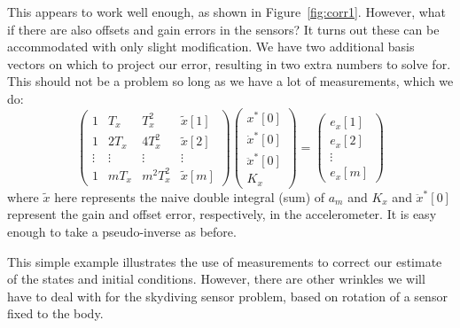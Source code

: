 \documentclass{amsart}
\begin{document}
This appears to work well enough, as shown in Figure~\ref{fig:corr1}. However, what if there are also offsets and gain errors in the sensors?  It turns out these can be accommodated with only slight modification.  We have two additional basis vectors on which to project our error, resulting in two extra numbers to solve for.  This should not be a problem so long as we have a lot of measurements, which we do:
\begin{equation}
\begin{pmatrix}
1 & T_x & T_x^2 & \tilde{x}[1]    \\
1 & 2T_x & 4T_x^2 & \tilde{x}[2] \\
\vdots & \vdots & \vdots & \vdots \\
1 & mT_x & m^2 T_x^2 & \tilde{x}[m] 
\end{pmatrix}
\begin{pmatrix}
x^*[0]\\
\dot{x}^*[0] \\
\ddot{x}^*[0] \\
K_x
\end{pmatrix}
= 
\begin{pmatrix}
e_x[1]\\
e_x[2]\\
\vdots \\
e_x[m]
\end{pmatrix}
\end{equation}
where $\tilde{x}$ here represents the naive double integral (sum) of $a_m$ and $K_x$ and $\ddot{x}^*[0]$ represent the gain and offset error, respectively, in the accelerometer.  It is easy enough to take a pseudo-inverse as before. 

This simple example illustrates the use of measurements to correct our estimate of the states and initial conditions.  However, there are other wrinkles we will have to deal with for the skydiving sensor problem, based on rotation of a sensor fixed to the body. 
\end{document}
